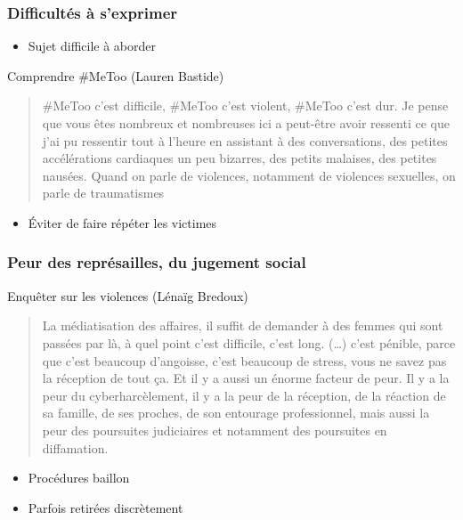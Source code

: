 \documentclass[french]{beamer}
\begin{document}
\begin{frame}
  \frametitle{Difficultés à s’exprimer}
  \begin{itemize}
    \item Sujet difficile à aborder
  \end{itemize}
  \begin{block}{Comprendre \#MeToo (Lauren Bastide)}
    \begin{quote}
      \#MeToo c'est difficile, \#MeToo c'est violent, \#MeToo c'est dur. Je pense que vous êtes nombreux et nombreuses ici a peut-être avoir ressenti ce que j'ai pu ressentir tout à l'heure en assistant à des conversations, des petites accélérations cardiaques un peu bizarres, des petits malaises, des petites nausées. Quand on parle de violences, notamment de violences sexuelles, on parle de traumatismes
    \end{quote}
  \end{block}
  \begin{itemize}
    \item Éviter de faire répéter les victimes
  \end{itemize}
\end{frame}

\begin{frame}
  \frametitle{Peur des représailles, du jugement social}
  \begin{block}{Enquêter sur les violences (Lénaïg Bredoux)}
    \begin{quote}
      La médiatisation des affaires, il suffit de demander à des femmes qui sont passées par là, à quel point c'est difficile, c'est long. (…) c'est pénible, parce que c'est beaucoup d'angoisse, c'est beaucoup de stress, vous ne savez pas la réception de tout ça. Et il y a aussi un énorme facteur de peur. Il y a la peur du cyberharcèlement, il y a la peur de la réception, de la réaction de sa famille, de ses proches, de son entourage professionnel, mais aussi la peur des poursuites judiciaires et notamment des poursuites en diffamation.
    \end{quote}
  \end{block}
  \begin{itemize}
    \item Procédures \og{}baillon\fg{}
    \item Parfois retirées discrètement
  \end{itemize}
\end{frame}
\end{document}
